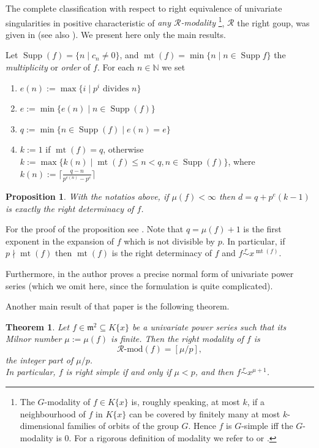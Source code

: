 \documentclass[11pt]{article}
\DeclareMathOperator{\supp}{Supp}
\newtheorem{Theorem}[Definition]{Theorem}
\newtheorem{Proposition}[Definition]{Proposition }
\newcommand{\N}{{\mathbb N}}
\newcommand{\kr}{{\mathcal R}}
\DeclareMathOperator{\mt}{mt}
\begin{document}
The complete classification with respect to  right equivalence of univariate singularities in positive characteristic of {\em any $\kr$-modality} \footnote{The $G$-modality of $f \in K\{x\}$ is, roughly speaking, at most $k$, if a neighbourhood of $f$ in $K\{x\}$ can be covered by finitely many at most $k$-dimensional families of orbits of the group $G$. Hence $f$ is $G$-simple iff the $G$-modality is 0.
For a rigorous definition of modality we refer to \cite{GN16} or \cite[Section 3.3.2]{GLS25}.}, $\kr$ the right goup, was given in  \cite{Ng12} (see also  \cite{Ng13}). We present here only the main results.

Let  $\supp(f) = \{n\mid c_n\ne 0\}$, and $\mt(f)=\min \{n \mid n \in \supp{f}\}$ the {\em multiplicity} or {\em order} of $f$. For each $n\in \N$ we set 
\begin{enumerate}
\item $e(n):=\max \{i\mid p^i \text{ divides } n\}$
\item $e:=\min \{e(n)\mid n \in \supp(f)\}$
\item $q:= \min \{n \in \supp(f)\mid e(n)=e\}$
\item $k:=1$ if $\mt(f)=q$, otherwise \\
$k := \max\{k(n)\mid \mt(f) \le n<q, n\in
\supp(f) \}$, 
where $k(n) := \lceil \frac{q-n}{p^{e(n)}-p^e} \rceil $
\end{enumerate}


\begin{Proposition} \label{prop.5.1}
With the notatios above, if $\mu(f) < \infty$ then $d = q+p^e(k-1)$ is exactly the right determinacy of $f$.
\end{Proposition} 
For the proof of the proposition see \cite[Proposition 2.8]{Ng12}. 
 Note that $q = \mu(f) + 1$  is the first exponent in the expansion of $f$ which is not divisible by $p$. In particular, if $p\nmid \mt(f)$ then $\mt(f)$ is the right determinacy of $f$ and $f\overset{r }{\sim} x^{\mt(f)}$.


Furthermore,  in \cite[Theorem 2.11]{Ng12}  the author proves a precise normal form of univariate power series (which we omit here, since the formulation is quite complicated).

Another main result of that paper is the following theorem.

\begin{Theorem}\label{thm1.5.0}
Let $f\in\mathfrak{m}^2\subseteq K\{x\}$ be a univariate power series such that its Milnor number $\mu:=\mu(f)$ is finite. Then the right modality of $f$ is
$$\mathcal{R}\text{-}\mathrm{mod}(f)=[\mu/p], $$
the integer part of $\mu/p$. \\
In particular, $f$ is right simple if and only if $\mu<p$, and then $f\overset{r }{\sim} x^{\mu+1}$.
\end{Theorem}
\end{document}
